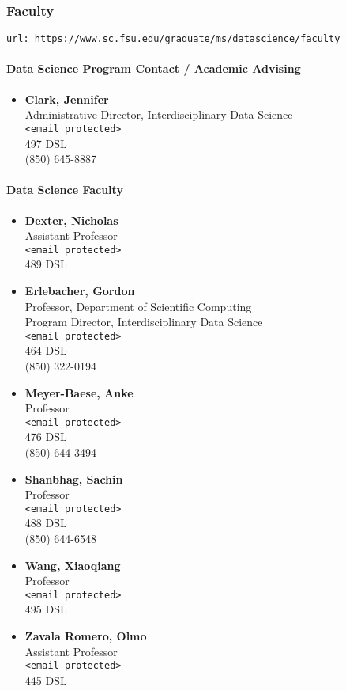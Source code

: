 \documentclass[12pt,a4paper]{article}
\begin{document}
\subsubsection{Faculty}
\texttt{url: https://www.sc.fsu.edu/graduate/ms/datascience/faculty}

\paragraph{Data Science Program Contact / Academic Advising}
\begin{itemize}
    \item \textbf{Clark, Jennifer} \\ Administrative Director, Interdisciplinary Data Science \\ \texttt{<email protected>} \\ 497 DSL \\ (850) 645-8887
\end{itemize}

\paragraph{Data Science Faculty}
\begin{itemize}
    \item \textbf{Dexter, Nicholas} \\ Assistant Professor \\ \texttt{<email protected>} \\ 489 DSL
    \item \textbf{Erlebacher, Gordon} \\ Professor, Department of Scientific Computing \\ Program Director, Interdisciplinary Data Science \\ \texttt{<email protected>} \\ 464 DSL \\ (850) 322-0194
    \item \textbf{Meyer-Baese, Anke} \\ Professor \\ \texttt{<email protected>} \\ 476 DSL \\ (850) 644-3494
    \item \textbf{Shanbhag, Sachin} \\ Professor \\ \texttt{<email protected>} \\ 488 DSL \\ (850) 644-6548
    \item \textbf{Wang, Xiaoqiang} \\ Professor \\ \texttt{<email protected>} \\ 495 DSL
    \item \textbf{Zavala Romero, Olmo} \\ Assistant Professor \\ \texttt{<email protected>} \\ 445 DSL
\end{itemize}
\end{document}
